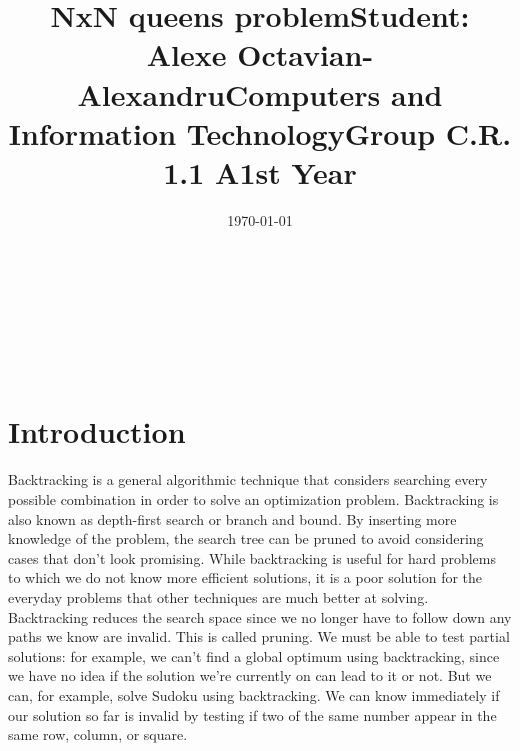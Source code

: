 \documentclass[14pt]{article}
\begin{document}
\title{\huge NxN queens problem}
\date{\today}
\maketitle
\begin{center}
\vspace{30 mm}

\title{\huge Student: Alexe Octavian-Alexandru}
\\\vspace{10 mm}
\title{\huge Computers and Information Technology}
\\\vspace{10 mm}
\title{\huge Group C.R. 1.1 A}
\\\vspace{10 mm}
\title{\huge 1st Year}
\date{}
\maketitle

\newpage
\section*{Introduction}
\vspace{20 mm}
Backtracking is a general algorithmic technique that considers searching every possible combination in order to solve an optimization problem. Backtracking is also known as depth-first search or branch and bound. By inserting more knowledge of the problem, the search tree can be pruned to avoid considering cases that don't look promising. While backtracking is useful for hard problems to which we do not know more efficient solutions, it is a poor solution for the everyday problems that other techniques are much better at solving.
\\
Backtracking reduces the search space since we no longer have to follow down any paths we know are invalid. This is called pruning. We must be able to test partial solutions: for example, we can’t find a global optimum using backtracking, since we have no idea if the solution we’re currently on can lead to it or not. But we can, for example, solve Sudoku using backtracking. We can know immediately if our solution so far is invalid by testing if two of the same number appear in the same row, column, or square.



\newpage
\end{center}
\end{document}
